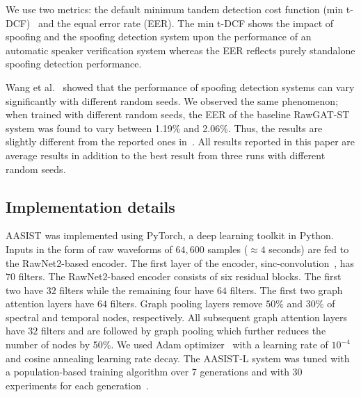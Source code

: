 \documentclass{article}
\begin{document}
We use two metrics: the default minimum tandem detection cost function (min t-DCF)~\cite{Kinnunen2018tdcf} and the equal error rate (EER). 
The min t-DCF shows the impact of spoofing and the spoofing detection system upon the performance of an automatic speaker verification system whereas the EER  
reflects purely standalone spoofing detection performance. 

Wang et al.~\cite{wang21fa_interspeech} showed that the performance of spoofing detection systems can vary significantly with different random seeds. 
We observed the same phenomenon; when trained with different random seeds, the EER of the baseline  RawGAT-ST~\cite{tak2021end} system was found to vary between 1.19\% and 2.06\%. 
Thus, the results are slightly different from the reported ones in~\cite{tak2021end}. 
All results reported in this paper are average results in addition to the best result from three runs with different random seeds. 

\subsection{Implementation details}
\label{ssec:implementation}
AASIST was implemented using PyTorch, a deep learning toolkit in Python. 
Inputs in the form of raw waveforms of $64,600$ samples ($\approx 4$ seconds) are fed to the RawNet2-based encoder. 
The first layer of the encoder, sinc-convolution~\cite{ravanelli2018speaker}, has $70$ filters. 
The RawNet2-based encoder consists of six residual blocks. 
The first two have $32$ filters while the remaining four have $64$ filters. 
The first two graph attention layers have $64$ filters. 
Graph pooling layers remove $50\%$ and $30\%$ of spectral and temporal nodes, respectively. 
All subsequent graph attention layers have $32$ filters and are followed by graph pooling which further reduces the number of nodes by 50\%.
We used Adam optimizer~\cite{Kingma2015adam} with a learning rate of $10^{-4}$  and cosine annealing learning rate decay. 
The AASIST-L system was tuned with a population-based training algorithm over 7 generations and with 30 experiments for each generation~\cite{jaderberg2017population}.
\end{document}
